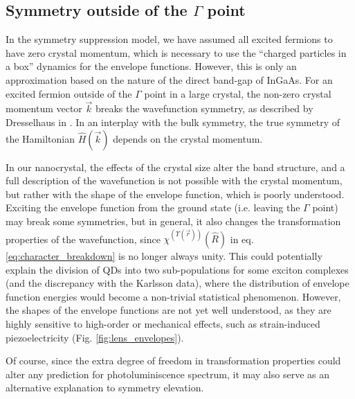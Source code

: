 \subsection{Symmetry outside of the $\Gamma$ point} \label{sec:symmetry_outside_gamma}
In the symmetry suppression model, we have assumed all excited fermions to have zero crystal momentum, which is necessary to use the ``charged particles in a box'' dynamics for the envelope functions. However, this is only an approximation based on the nature of the direct band-gap of InGaAs. For an excited fermion outside of the $\Gamma$ point in a large crystal, the non-zero crystal momentum vector $\vec{k}$ breaks the wavefunction symmetry, as described by Dresselhaus in \cite[Ch. 13]{dresselhaus}. In an interplay with the bulk symmetry, the true symmetry of the Hamiltonian $\hat{H}\left(\vec{k}\right)$ depends on the crystal momentum. 

In our nanocrystal, the effects of the crystal size alter the band structure, and a full description of the wavefunction is not possible with the crystal momentum, but rather with the shape of the envelope function, which is poorly understood. Exciting the envelope function from the ground state (i.e. leaving the $\Gamma$ point) may break some symmetries, but in general, it also changes the transformation properties of the wavefunction, since $\chi^{\left(\Upsilon\left(\vec{r}\right)\right)}\left(\hat{R}\right)$ in eq. \ref{eq:character_breakdown} is no longer always unity. This could potentially explain the division of QDs into two sub-populations for some exciton complexes (and the discrepancy with the Karlsson data), where the distribution of envelope function energies would become a non-trivial statistical phenomenon. However, the shapes of the envelope functions are not yet well understood, as they are highly sensitive to high-order or mechanical effects, such as strain-induced piezoelectricity (Fig. \ref{fig:lens_envelopes}).

Of course, since the extra degree of freedom in transformation properties could alter any prediction for photoluminiscence spectrum, it may also serve as an alternative explanation to symmetry elevation.\\

